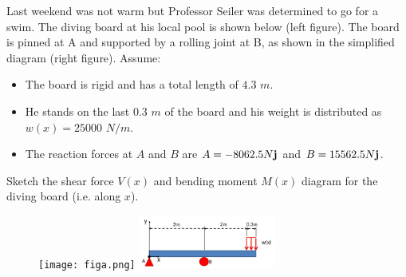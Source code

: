 
\noindent Last weekend was not warm but Professor Seiler was determined to go for a swim. The
diving board at his local pool is shown below (left figure). The board is pinned at A and supported by a rolling
joint at B, as shown in the simplified diagram (right figure). Assume:
\begin{itemize}
  \item The board is rigid and has a total length of $4.3$ $m$.
  \item He stands on the last $0.3$ $m$ of the board and his weight is distributed as $w(x) = 25000$ $N/m$.
  \item The reaction forces at $A$ and $B$ are $A = -8062.5N \bf j$ and $B = 15562.5N \bf j$.
\end{itemize}

\noindent Sketch the shear force $V(x)$ and bending moment $M(x)$ diagram for the diving board (i.e. along $x$).

\begin{figure}[ht!]
  \centering
  \texttt{[image: figa.png]}
  \includegraphics[width=0.4\textwidth,
	           height=0.3\textheight,
		   keepaspectratio]{figb.png}
\end{figure}

